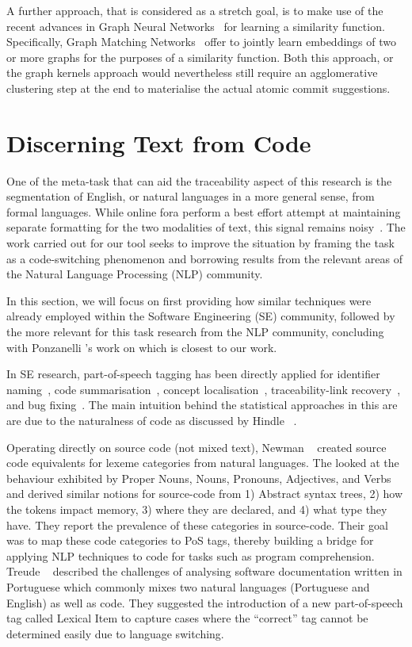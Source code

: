 A further approach, that is considered as a stretch goal, is to make use of the
recent advances in Graph Neural Networks~\cite{scarselli2008graph} for learning
a similarity function. Specifically, Graph Matching
Networks~\cite{DBLP:journals/corr/abs-1904-12787} offer to jointly learn
embeddings of two or more graphs for the purposes of a similarity function. Both
this approach, or the graph kernels approach would nevertheless still require an
agglomerative clustering step at the end to materialise the actual atomic commit
suggestions.

\section{Discerning Text from Code}
\label{chapter:literature:sec:posit_rel_work}

One of the meta-task that can aid the traceability aspect of this research is
the segmentation of English, or natural languages in a more general sense, from
formal languages. While online fora perform a best effort attempt at maintaining
separate formatting for the two modalities of text, this signal remains
noisy~\cite{ponzanelli2014improving}. The work carried out for our tool seeks to
improve the situation by framing the task as a code-switching phenomenon and
borrowing results from the relevant areas of the Natural Language Processing
(NLP) community.

In this section, we will focus on first providing how similar techniques were
already employed within the Software Engineering (SE) community, followed by the
more relevant for this task research from the NLP community, concluding with
Ponzanelli \etal's work on \SO which is closest to our work.

In SE research, part-of-speech tagging has been directly applied for identifier
naming~\cite{Binkley2011}, code summarisation~\cite{Haiduc2010a, Haiduc2010b},
concept localisation~\cite{Abebe2010}, traceability-link
recovery~\cite{Capobianco2013}, and bug fixing~\cite{Tian2015}. The main
intuition behind the statistical approaches in this are are due to the
naturalness of code as discussed by Hindle \etal~\cite{hindle2012naturalness}.

Operating directly on source code (not mixed text), Newman
\etal~\cite{Newman2017} created source code equivalents for lexeme categories
from natural languages. The looked at the behaviour exhibited by Proper Nouns,
Nouns, Pronouns, Adjectives, and Verbs and derived similar notions for
source-code from 1) Abstract syntax trees, 2) how the tokens impact memory, 3)
where they are declared, and 4) what type they have. They report the prevalence
of these categories in source-code. Their goal was to map these code categories
to PoS tags, thereby building a bridge for applying NLP techniques to code for
tasks such as program comprehension. Treude \etal~\cite{Treude2015portuguese}
described the challenges of analysing software documentation written in
Portuguese which commonly mixes two natural languages (Portuguese and English)
as well as code. They suggested the introduction of a new part-of-speech tag
called Lexical Item to capture cases where the ``correct'' tag cannot be
determined easily due to language switching.

